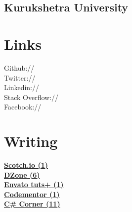\documentclass[]{gagan-resume}
\begin{document}
\begin{minipage}[t]{0.33\textwidth}
\subsection{Kurukshetra University}
\sectionsep




\section{Links} 
Github:// \href{https://github.com/sikrigagan}{} \\
Twitter://  \href{https://twitter.com/sikrigagan}{} \\
Linkedin://  \href{https://linkedin.com/in/sikrigagan}{} \\
Stack Overflow://  \href{https://stackoverflow.com/users/4129965/sikrigagan}{} \\
Facebook://  \href{https://facebook.com/sikrigagan}{}
\sectionsep



\section{Writing} 
\textbf{\href{https://scotch.io/@sikrigagan}{Scotch.io (1)}}\\
\textbf{\href{https://dzone.com/users/2733735/sikrigagan.html}{DZone (6)}}\\
\textbf{\href{https://tutsplus.com/authors/gagan-sikri}{Envato tuts+ (1)}}\\
\textbf{\href{https://www.codementor.io/sikrigagan}{Codementor (1)}}\\
\textbf{\href{http://www.c-sharpcorner.com/members/gagan-sikri}{C\# Corner (11)}}\\
\sectionsep



\end{minipage} 
\hfill
\end{document}
